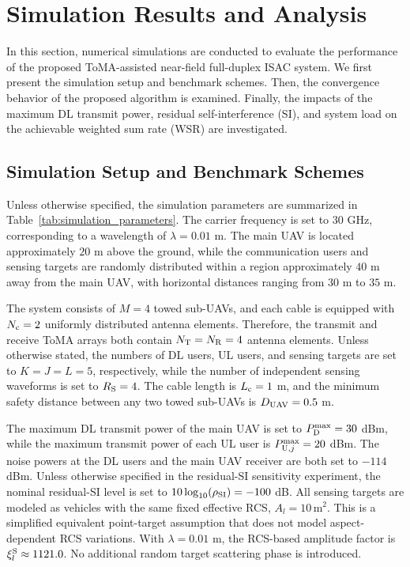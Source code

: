 \documentclass[letterpaper,journal]{IEEEtran}
\begin{document}
\section{Simulation Results and Analysis}
\label{sec:simulation}

In this section, numerical simulations are conducted to evaluate the
performance of the proposed ToMA-assisted near-field full-duplex ISAC
system. We first present the simulation setup and benchmark schemes.
Then, the convergence behavior of the proposed algorithm is examined.
Finally, the impacts of the maximum DL transmit power, residual
self-interference (SI), and system load on the achievable weighted sum
rate (WSR) are investigated.

\subsection{Simulation Setup and Benchmark Schemes}
\label{subsec:simulation_setup}

Unless otherwise specified, the simulation parameters are summarized in
Table~\ref{tab:simulation_parameters}. The carrier frequency is set to
$30$ GHz, corresponding to a wavelength of $\lambda=0.01$ m. The main
UAV is located approximately $20$ m above the ground, while the
communication users and sensing targets are randomly distributed within
a region approximately $40$ m away from the main UAV, with horizontal
distances ranging from $30$ m to $35$ m.

The system consists of $M=4$ towed sub-UAVs, and each cable is equipped
with $N_{\rm c}=2$ uniformly distributed antenna elements. Therefore,
the transmit and receive ToMA arrays both contain
$N_{\rm T}=N_{\rm R}=4$ antenna elements. Unless otherwise stated, the
numbers of DL users, UL users, and sensing targets are set to
$K=J=L=5$, respectively, while the number of independent sensing
waveforms is set to $R_{\rm S}=4$. The cable length is
$L_{\rm c}=1$ m, and the minimum safety distance between any two towed
sub-UAVs is $D_{\rm UAV}=0.5$ m.

The maximum DL transmit power of the main UAV is set to
$P_{\rm D}^{\max}=30$ dBm, while the maximum transmit power of each UL
user is $P_{{\rm U},j}^{\max}=20$ dBm. The noise powers at the DL users
and the main UAV receiver are both set to $-114$ dBm. Unless otherwise
specified in the residual-SI sensitivity experiment, the nominal
residual-SI level is set to
$10\log_{10}(\rho_{\rm SI})=-100$ dB. All sensing targets are modeled
as vehicles with the same fixed effective RCS, $A_l=10\,\mathrm{m}^2$.
This is a simplified equivalent point-target assumption that does not
model aspect-dependent RCS variations. With $\lambda=0.01$ m, the
RCS-based amplitude factor is $\xi_l^{\rm S}\approx1121.0$.
No additional random target scattering phase is introduced.
\end{document}
